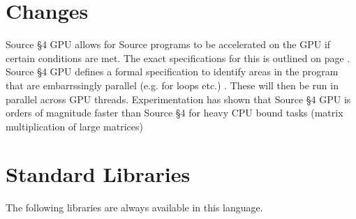 





\section{Changes}

Source \S 4 GPU allows for Source programs to be accelerated on the GPU if certain conditions are met.
The exact specifications for this is outlined on page \pageref{gpu_supp}. Source \S 4 GPU  defines a formal specification 
to identify areas in the program that are embarrssingly parallel (e.g. for loops etc.) . These will then
be run in parallel across GPU threads. Experimentation has shown that Source \S 4 GPU is orders of magnitude faster
than Source \S 4 for heavy CPU bound tasks (matrix multiplication of large matrices)





\newpage





















\section{Standard Libraries}

The following libraries are always available in this language.











